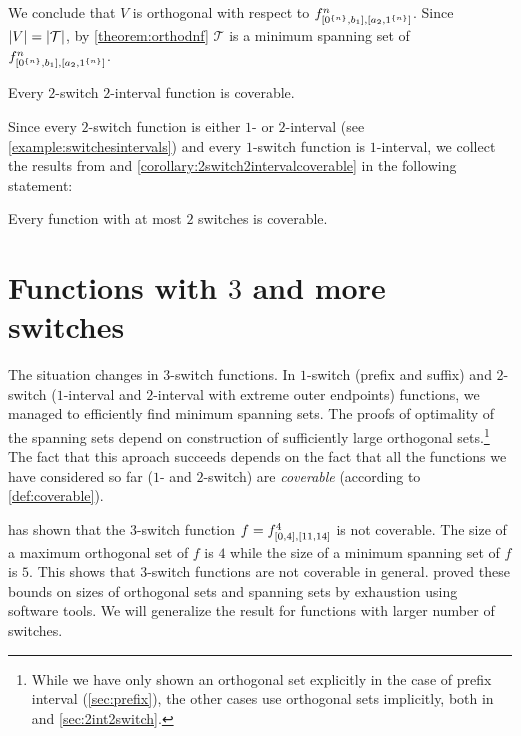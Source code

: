 We conclude that $V$ is orthogonal
with respect to $f^{n}_{[0^{\{n\}}, b_1], [a_2, 1^{\{n\}}]}$.
Since $\lvert V\rvert = \lvert\mathcal{T}\rvert$,
by \cref{theorem:orthodnf} $\mathcal{T}$
is a minimum spanning set of $f^{n}_{[0^{\{n\}}, b_1], [a_2, 1^{\{n\}}]}$.

\begin{corollary}
\label{corollary:2switch2intervalcoverable}
Every $2$-switch $2$-interval function is coverable.
\end{corollary}

Since every $2$-switch function is either $1$- or $2$-interval (see \cref{example:switchesintervals})
and every $1$-switch function is $1$-interval,
we collect the results from 
and \cref{corollary:2switch2intervalcoverable}
in the following statement:
\begin{corollary}
Every function with at most $2$ switches is coverable.
\end{corollary}

\section{Functions with \texorpdfstring{$3$}{3}
and more switches}
\label{sec:3switch}

The situation changes in $3$-switch functions.
In $1$-switch (prefix and suffix)
and $2$-switch ($1$-interval and $2$-interval
with extreme outer endpoints)
functions,
we managed to efficiently find minimum spanning sets.
The proofs of optimality of the spanning sets
depend on construction of sufficiently large
orthogonal sets.\footnote{While we have only shown
an orthogonal set explicitly
in the case of prefix interval (\autoref{sec:prefix}),
the other cases use orthogonal sets implicitly,
both in \citep{Schieber2005154}
and \autoref{sec:2int2switch}.}
The fact that this aproach succeeds
depends on the fact that all the functions we have considered so far ($1$- and $2$-switch)
are \emph{coverable}
(according to \cref{def:coverable}).

\citeauthor{Dubovsky2012} has shown that
the $3$-switch function
$f = f^{4}_{[0, 4], [11, 14]}$ is not coverable.
The size of a maximum orthogonal set of $f$ is $4$
while the size of a minimum spanning set of $f$ is $5$.
\citep[p.~32]{Dubovsky2012}
This shows that $3$-switch functions are not coverable in general.
\citeauthor{Dubovsky2012} proved these bounds
on sizes of orthogonal sets and spanning sets
by exhaustion using software tools.
We will generalize the result for functions
with larger number of switches.

